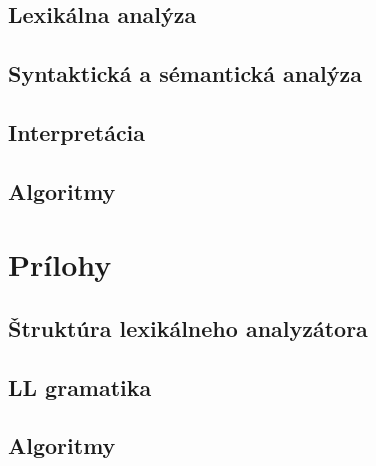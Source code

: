 \documentclass[12pt]{article}
\begin{document}
		\subsection{Lexikálna analýza}
		\subsection{Syntaktická a sémantická analýza}
		\subsection{Interpretácia}
		\subsection{Algoritmy}
	\section{Prílohy}
		\subsection{Štruktúra lexikálneho analyzátora}
		\subsection{LL gramatika}
		\subsection{Algoritmy}
\end{document}
